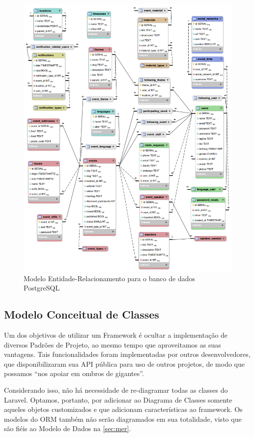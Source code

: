 \documentclass[12pt,a4paper,twoside,hyphens,english,brazil]{abntex2}
\begin{document}
{\begin{figure}
\centering
	\includegraphics[width=1\linewidth]{diagramas/modelo-dados.png}
	\caption{Modelo Entidade-Relacionamento para o banco de dados PostgreSQL}
	\label{diag:mer}
\end{figure}

\FloatBarrier
\subsection{Modelo Conceitual de Classes} \label{sec:classes}
Um dos objetivos de utilizar um Framework é ocultar a implementação de diversos Padrões de Projeto, ao mesmo tempo que aproveitamos as suas vantagens. Tais funcionalidades foram implementadas por outros desenvolvedores, que disponibilizaram sua API pública para uso de outros projetos, de modo que possamos ``nos apoiar em ombros de gigantes''.

Considerando isso, não há necessidade de re-diagramar todas as classes do Laravel. Optamos, portanto, por adicionar ao Diagrama de Classes somente aqueles objetos customizados e que adicionam características ao framework. Os modelos do ORM também não serão diagramados em sua totalidade, visto que são fiéis ao Modelo de Dados na \autoref{sec:mer}.

}
\end{document}

